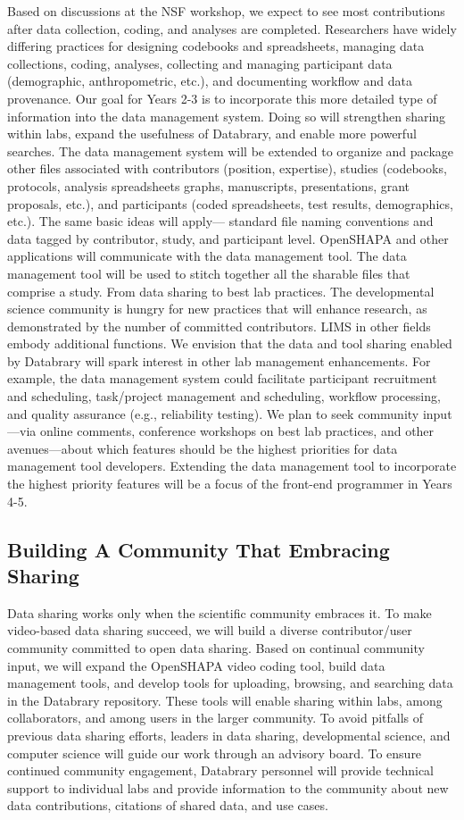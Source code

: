 \documentclass[letterpaper,man,natbib]{apa6}
\begin{document}
Based on discussions at the NSF workshop, we expect to see most contributions after data collection, coding, and analyses are completed. Researchers have widely differing practices for designing codebooks and spreadsheets, managing data collections, coding, analyses, collecting and managing participant data (demographic, anthropometric, etc.), and documenting workflow and data provenance. Our goal for Years 2-3 is to incorporate this more detailed type of information into the data management system. Doing so will strengthen sharing within labs, expand the usefulness of Databrary, and enable more powerful searches. The data management system will be extended to organize and package other files associated with contributors (position, expertise), studies (codebooks, protocols, analysis spreadsheets graphs, manuscripts, presentations, grant proposals, etc.), and participants (coded spreadsheets, test results, demographics, etc.). The same basic ideas will apply— standard file naming conventions and data tagged by contributor, study, and participant level. OpenSHAPA and other applications will communicate with the data management tool. The data management tool will be used to stitch together all the sharable files that comprise a study.
From data sharing to best lab practices. The developmental science community is hungry for new practices that will enhance research, as demonstrated by the number of committed contributors. LIMS in other fields embody additional functions. We envision that the data and tool sharing enabled by Databrary will spark interest in other lab management enhancements. For example, the data management system could facilitate participant recruitment and scheduling, task/project management and scheduling, workflow processing, and quality assurance (e.g., reliability testing). We plan to seek community input—via online comments, conference workshops on best lab practices, and other avenues—about which features should be the highest priorities for data management tool developers. Extending the data management tool to incorporate the highest priority features will be a focus of the front-end programmer in Years 4-5.

\subsection{Building A Community That Embracing Sharing}
Data sharing works only when the scientific community embraces it. 
To make video-based data sharing succeed, we will build a diverse contributor/user community committed to open data sharing. 
Based on continual community input, we will expand the OpenSHAPA video coding tool, build data management tools, and develop tools for uploading, browsing, and searching data in the Databrary repository. 
These tools will enable sharing within labs, among collaborators, and among users in the larger community. To avoid pitfalls of previous data sharing efforts, leaders in data sharing, developmental science, and computer science will guide our work through an advisory board. 
To ensure continued community engagement, Databrary personnel will provide technical support to individual labs and provide information to the community about new data contributions, citations of shared data, and use cases.
\end{document}
